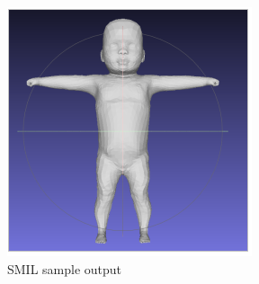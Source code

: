\begin{figure}[h]
        \caption{SMIL sample output}
        \centering
        \includegraphics[]{images/smil.png}
\end{figure}



